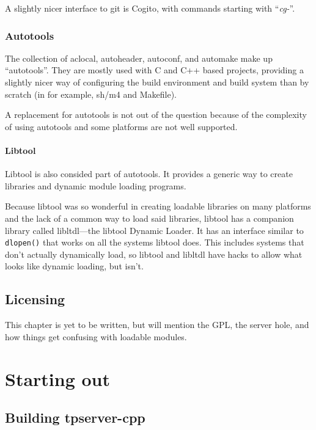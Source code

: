 \documentclass[a4paper,11pt]{report}
\newcommand{\filename}[1]{\emph{#1}}
\newcommand{\codename}[1]{\texttt{#1}}
\begin{document}
A slightly nicer interface to git is Cogito, with commands starting with ``\filename{cg-}''.

\section{Autotools}
\label{sec:autotools}

The collection of aclocal, autoheader, autoconf, and automake make up ``autotools''. They are mostly used with C and C++ based projects, providing a slightly nicer way of configuring the build environment and build system than by scratch (in for example, sh/m4 and Makefile).

A replacement for autotools is not out of the question because of the complexity of using autotools and some platforms are not well supported.

\subsection{Libtool}
\label{sec:libtool}

Libtool is also consided part of autotools. It provides a generic way to create libraries and dynamic module loading programs.

Because libtool was so wonderful in creating loadable libraries on many platforms and the lack of a common way to load said libraries, libtool has a companion library called libltdl---the libtool Dynamic Loader.  It has an interface similar to \codename{dlopen()} that works on all the systems libtool does. This includes systems that don't actually dynamically load, so libtool and libltdl have hacks to allow what looks like dynamic loading, but isn't.

\chapter{Licensing}
\label{sec:licensing}

This chapter is yet to be written, but will mention the GPL, the server hole, and how things get confusing with loadable modules.

\part{Starting out}
\label{part:starting}

\chapter{Building tpserver-cpp}
\label{chap:building-tpserver-cpp}
\end{document}
